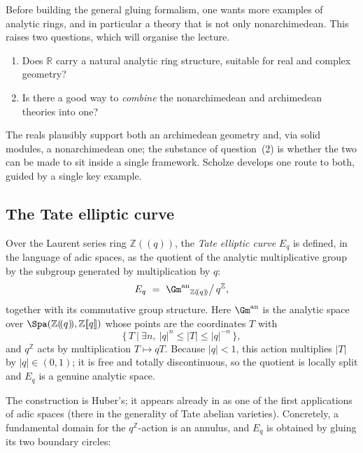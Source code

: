 Before building the general gluing formalism, one wants more examples of
analytic rings, and in particular a theory that is not only nonarchimedean.
This raises two questions, which will organise the lecture.

\begin{remark}
\label{rmk:12:two-questions}
\begin{enumerate}
\item Does $\mathbb{R}$ carry a natural analytic ring structure, suitable for
real and complex geometry?
\item Is there a good way to \emph{combine} the nonarchimedean and archimedean
theories into one?
\end{enumerate}
The reals plausibly support both an archimedean geometry and, via solid modules,
a nonarchimedean one; the substance of question~(2) is whether the two can be
made to sit inside a single framework. Scholze develops one route to both,
guided by a single key example.
\end{remark}

\subsection{The Tate elliptic curve}

\begin{definition}
\label{def:12:tate-curve}
Over the Laurent series ring $\mathbb{Z}(\!(q)\!)$, the \emph{Tate elliptic
curve} $E_q$ is defined, in the language of adic spaces, as the quotient of the
analytic multiplicative group by the subgroup generated by multiplication by
$q$:
\begin{equation*}
E_q\ =\ {\Gm^{\mathrm{an}}}_{\mathbb{Z}(\!(q)\!)}\big/\,q^{\mathbb{Z}},
\end{equation*}
together with its commutative group structure. Here $\Gm^{\mathrm{an}}$ is the
analytic space over $\Spa(\mathbb{Z}(\!(q)\!),\mathbb{Z}[\![q]\!])$ whose points
are the coordinates $T$ with
\begin{equation*}
\bigl\{\,T\ \big|\ \exists n,\ |q|^{n}\le |T|\le |q|^{-n}\,\bigr\},
\end{equation*}
and $q^{\mathbb{Z}}$ acts by multiplication $T\mapsto qT$. Because $|q|<1$, this
action multiplies $|T|$ by $|q|\in(0,1)$; it is free and totally discontinuous,
so the quotient is locally split and $E_q$ is a genuine analytic space.
\end{definition}

The construction is Huber's; it appears already in \cite{Huber_1994} as one of
the first applications of adic spaces (there in the generality of Tate abelian
varieties). Concretely, a fundamental domain for the $q^{\mathbb{Z}}$-action is
an annulus, and $E_q$ is obtained by gluing its two boundary circles:

